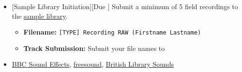 \begin{itemize}[noitemsep,topsep=0pt,leftmargin=*]
	\item {}[Sample Library Initiation][Due \dSun] \newline 
 Submit a minimum of 5 field recordings to the \href{\#}{sample library}.
	      \begin{itemize}
		      \item \textbf{Filename:} \texttt{[TYPE] Recording RAW (Firstname Lastname)}
		      \item \textbf{Track Submission:} Submit your file names to \discordE
	      \end{itemize}
	\item {} \href{https://sound-effects.bbcrewind.co.uk/}{BBC Sound Effects}, \href{https://freesound.org/}{freesound}, \href{https://sounds.bl.uk/}{British Library Sounds}
\end{itemize}
